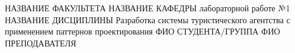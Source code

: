\documentclass{bmstu}
\begin{document}
\makereporttitle
    {НАЗВАНИЕ ФАКУЛЬТЕТА}
    {НАЗВАНИЕ КАФЕДРЫ}
    {лабораторной работе №1}
    {НАЗВАНИЕ ДИСЦИПЛИНЫ}
    {Разработка системы туристического агентства с применением паттернов проектирования}
    {}
    {ФИО СТУДЕНТА/ГРУППА}
    {ФИО ПРЕПОДАВАТЕЛЯ}

\maketableofcontents




\makebibliography


\end{document}
